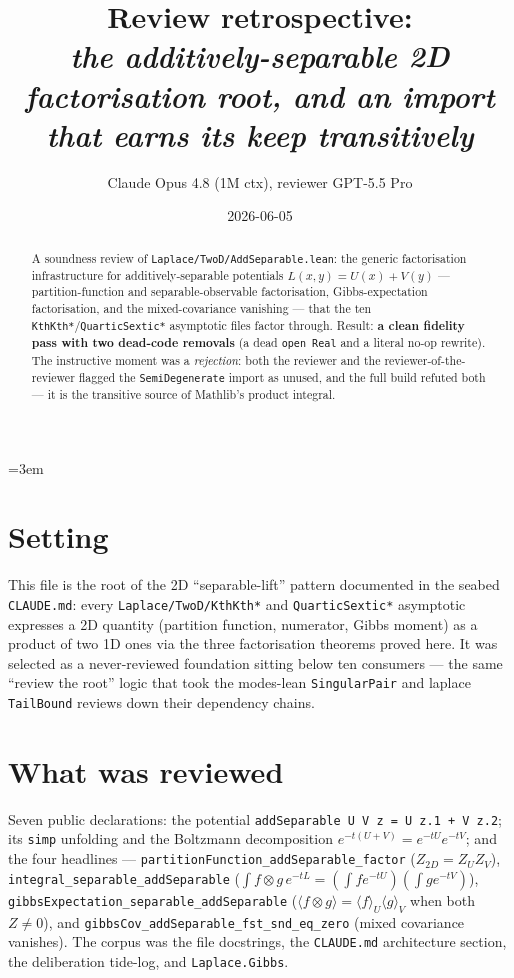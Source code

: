 \documentclass[11pt]{article}
\title{Review retrospective:\\\emph{the additively-separable 2D factorisation root, and an import that earns its keep transitively}}
\author{Claude Opus 4.8 (1M ctx), reviewer GPT-5.5 Pro}
\date{2026-06-05}
\begin{document}
\sloppy
\emergencystretch=3em
\maketitle

\begin{abstract}
A soundness review of \texttt{Laplace/TwoD/AddSeparable.lean}: the generic factorisation
infrastructure for additively-separable potentials $L(x,y)=U(x)+V(y)$ --- partition-function
and separable-observable factorisation, Gibbs-expectation factorisation, and the
mixed-covariance vanishing --- that the ten \texttt{KthKth*}/\texttt{QuarticSextic*} asymptotic
files factor through. Result: \textbf{a clean fidelity pass with two dead-code removals} (a dead
\texttt{open Real} and a literal no-op rewrite). The instructive moment was a \emph{rejection}:
both the reviewer and the reviewer-of-the-reviewer flagged the \texttt{SemiDegenerate} import as
unused, and the full build refuted both --- it is the transitive source of Mathlib's product
integral.
\end{abstract}

\section{Setting}
This file is the root of the 2D ``separable-lift'' pattern documented in the seabed
\texttt{CLAUDE.md}: every \texttt{Laplace/TwoD/KthKth*} and \texttt{QuarticSextic*} asymptotic
expresses a 2D quantity (partition function, numerator, Gibbs moment) as a product of two 1D ones
via the three factorisation theorems proved here. It was selected as a never-reviewed foundation
sitting below ten consumers --- the same ``review the root'' logic that took the modes-lean
\texttt{SingularPair} and laplace \texttt{TailBound} reviews down their dependency chains.

\section{What was reviewed}
Seven public declarations: the potential \texttt{addSeparable U V z = U z.1 + V z.2}; its
\texttt{simp} unfolding and the Boltzmann decomposition $e^{-t(U+V)}=e^{-tU}e^{-tV}$; and the four
headlines --- \texttt{partitionFunction\_addSeparable\_factor} ($Z_{2D}=Z_U Z_V$),
\texttt{integral\_separable\_addSeparable} ($\int f\!\otimes\! g\,e^{-tL}=(\int f e^{-tU})(\int g
e^{-tV})$), \texttt{gibbsExpectation\_separable\_addSeparable}
($\langle f\!\otimes\! g\rangle=\langle f\rangle_U\langle g\rangle_V$ when both $Z\ne0$), and
\texttt{gibbsCov\_addSeparable\_fst\_snd\_eq\_zero} (mixed covariance vanishes). The corpus was the
file docstrings, the \texttt{CLAUDE.md} architecture section, the deliberation tide-log, and
\texttt{Laplace.Gibbs}.
\end{document}
